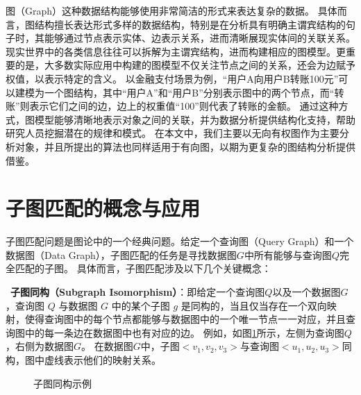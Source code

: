 图（Graph）这种数据结构能够使用非常简洁的形式来表达复杂的数据。
具体而言，图结构擅长表达形式多样的数据结构，特别是在分析具有明确主谓宾结构的句子时，其能够通过节点表示实体、边表示关系，进而清晰展现实体间的关联关系。
现实世界中的各类信息往往可以拆解为主谓宾结构，进而构建相应的图模型。更重要的是，大多数实际应用中构建的图模型不仅关注节点之间的关系，还会为边赋予权值，以表示特定的含义。
以金融支付场景为例，“用户A向用户B转账100元”可以建模为一个图结构，其中“用户A”和“用户B”分别表示图中的两个节点，而“转账”则表示它们之间的边，边上的权重值“100”则代表了转账的金额。
通过这种方式，图模型能够清晰地表示对象之间的关联，并为数据分析提供结构化支持，帮助研究人员挖掘潜在的规律和模式。
在本文中，我们主要以无向有权图作为主要分析对象，并且所提出的算法也同样适用于有向图，以期为更复杂的图结构分析提供借鉴。

\section{子图匹配的概念与应用}
\label{section:subgraph-match}
子图匹配问题是图论中的一个经典问题\cite{sm-ullmann-DBLP:journals/jacm/Ullmann76}。给定一个查询图（Query Graph）和一个数据图（Data Graph），子图匹配的任务是寻找数据图$G$中所有能够与查询图$Q$完全匹配的子图。
具体而言，子图匹配涉及以下几个关键概念：

    \textbullet~\textbf{子图同构（Subgraph Isomorphism）}：即给定一个查询图$Q$以及一个数据图$G$，查询图 $Q$ 与数据图 $G$ 中的某个子图 $g$ 是同构的，当且仅当存在一个双向映射，使得查询图中的每个节点都能够与数据图中的一个唯一节点一一对应，并且查询图中的每一条边在数据图中也有对应的边。
    例如，如图\ref{fig:example_subgraph_matching}所示，左侧为查询图$Q$，右侧为数据图$G$。
    在数据图$G$中，子图$<v_1,v_2,v_3>$与查询图$<u_1,u_2,u_3>$同构，图中虚线表示他们的映射关系。
    \begin{figure}[h!]
        \centering
        \caption{子图同构示例}
        \label{fig:example_subgraph_matching}
    \end{figure}

